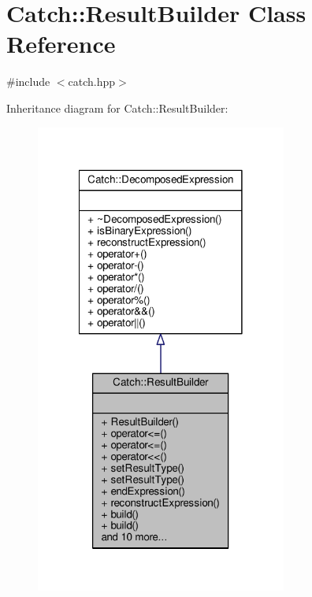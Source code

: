 \hypertarget{class_catch_1_1_result_builder}{\section{Catch\-:\-:Result\-Builder Class Reference}
\label{class_catch_1_1_result_builder}
}


{\ttfamily \#include $<$catch.\-hpp$>$}



Inheritance diagram for Catch\-:\-:Result\-Builder\-:
\nopagebreak
\begin{figure}[H]
\begin{center}
\leavevmode
\includegraphics[width=234pt]{class_catch_1_1_result_builder__inherit__graph}
\end{center}
\end{figure}


